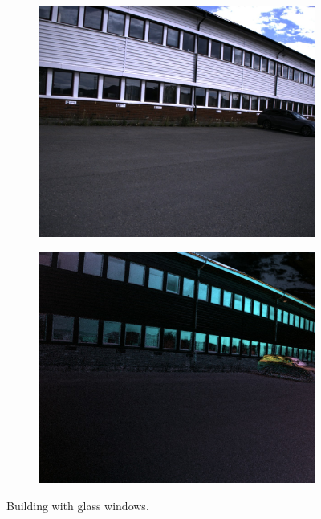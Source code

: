 \begin{figure}[H]
    \begin{subfigure}[T]{.49\textwidth}
        \includegraphics[width=\textwidth]{figures/pictures/img_5742_s0.jpg}
    \end{subfigure} \hfill
    \begin{subfigure}[T]{.49\textwidth}
        \includegraphics[width=\textwidth]{figures/pictures/img_5742_pol.jpg}
    \end{subfigure}
    \caption{Building with glass windows.}
\end{figure}
\vspace{-.5cm}


